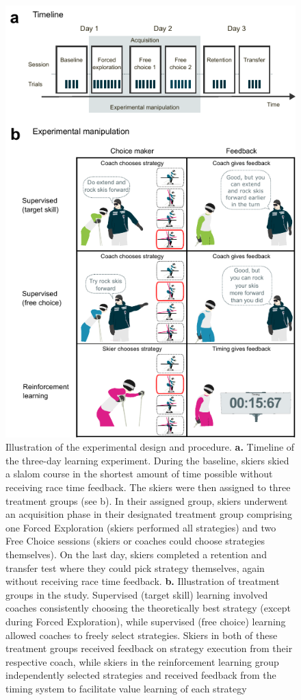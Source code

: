 \documentclass[pdflatex,sn-mathphys-num]{sn-jnl}%
\theoremstyle{thmstyleone}%
\theoremstyle{thmstyletwo}%
\theoremstyle{thmstylethree}%
\begin{document}
\begin{figure}[H]
\centering
\includegraphics{figures/figure_method_experiment.pdf}
\caption{Illustration of the experimental design and procedure. \textbf{a.} Timeline of the three-day learning experiment. During the baseline, skiers skied a slalom course in the shortest amount of time possible without receiving race time feedback. The skiers were then assigned to three treatment groups (see b). In their assigned group, skiers underwent an acquisition phase in their designated treatment group comprising one Forced Exploration (skiers performed all strategies) and two Free Choice sessions (skiers or coaches could choose strategies themselves). On the last day, skiers completed a retention and transfer test where they could pick strategy themselves, again without receiving race time feedback. \textbf{b.} Illustration of treatment groups in the study. Supervised (target skill) learning involved coaches consistently choosing the theoretically best strategy (except during Forced Exploration), while supervised (free choice) learning allowed coaches to freely select strategies. Skiers in both of these treatment groups received feedback on strategy execution from their respective coach, while skiers in the reinforcement learning group independently selected strategies and received feedback from the timing system to facilitate value learning of each strategy}
\label{fig:experiment}
\end{figure}
\end{document}
